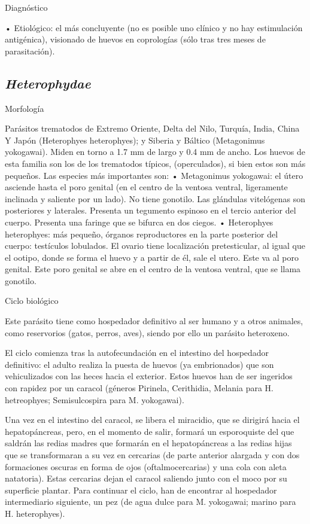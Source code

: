 Diagnóstico

• Etiológico: el más concluyente (no es posible uno clínico y no hay estimulación antigénica), visionado de huevos en coprologías (sólo tras tres meses de parasitación).
\newpage
\subsection{\textit{Heterophydae}}
Morfología

Parásitos trematodos de Extremo Oriente, Delta del Nilo, Turquía, India, China Y Japón (Heterophyes heterophyes); y Siberia y Báltico (Metagonimus yokogawai). Miden en torno a 1.7 mm de largo y 0.4 mm de ancho. Los huevos de esta familia son los de los trematodos típicos, (operculados), si bien estos son más pequeños. Las especies más importantes son:
• Metagonimus yokogawai: el útero asciende hasta el poro genital (en el centro de la ventosa ventral, ligeramente inclinada y saliente por un lado). No tiene gonotilo. Las glándulas vitelógenas son posteriores y laterales. Presenta un tegumento espinoso en el tercio anterior del cuerpo. Presenta una faringe que se bifurca en dos ciegos.
• Heterophyes heterophyes: más pequeño, órganos reproductores en la parte posterior del cuerpo: testículos lobulados. El ovario tiene localización pretesticular, al igual que el ootipo, donde se forma el huevo y a partir de él, sale el utero. Este va al poro genital. Este poro genital se abre en el centro de la ventosa ventral, que se llama gonotilo.

Ciclo biológico

Este parásito tiene como hospedador definitivo al ser humano y a otros animales, como reservorios (gatos, perros, aves), siendo por ello un parásito heteroxeno.

El ciclo comienza tras la autofecundación en el intestino del hospedador definitivo: el adulto realiza la puesta de huevos (ya embrionados) que son vehiculizados con las heces hacia el exterior. Estos huevos han de ser ingeridos con rapidez por un caracol (géneros Pirinela, Cerithidia, Melania para H. hetreophyes; Semisulcospira para M. yokogawai). 

Una vez en el intestino del caracol, se libera el miracidio, que se dirigirá hacia el hepatopáncreas, pero, en el momento de salir, formará un esporoquiste del que saldrán las redias madres que formarán en el hepatopáncreas a las redias hijas que se transformaran a su vez en cercarias (de parte anterior alargada y con dos formaciones oscuras en forma de ojos (oftalmocercarias) y una cola con aleta natatoria). Estas cercarias dejan el caracol saliendo junto con el moco por su superficie plantar. Para continuar el ciclo, han de encontrar al hospedador intermediario siguiente, un pez (de agua dulce para M. yokogawai; marino para H. heterophyes).

